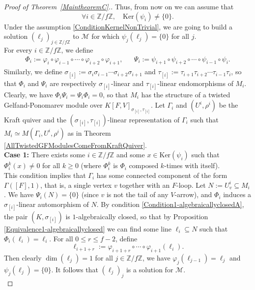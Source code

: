 \documentclass[12pt]{amsart}
\theoremstyle{definition}
\newcommand{\<}{\langle}   %
\renewcommand{\>}{\rangle} %
\begin{document}
\begin{proof}[Proof of Theorem~\ref{MaintheoremC}.]
    Thus, from now on we can assume that 
    \begin{equation}\label{ConditionKernelNonTrivial}
        \forall i \in \mathbb Z/f\mathbb Z, \quad \mathrm{Ker}(\psi_i) \not = \{0\}.
    \end{equation}
   Under the assumption \eqref{ConditionKernelNonTrivial}, we are going to build a solution $(\ell_j)_{j \in \mathbb Z/f\mathbb Z}$ to $\mathcal M$ for which $\psi_{j}(\ell_j) = \{0\}$ for all $j$.\\
    
    For every $i \in \mathbb Z/f\mathbb Z$, we define 
    \begin{align*}
        \Phi_i := \varphi_i \circ \varphi_{i-1} \circ \cdots \circ \varphi_{i+2} \circ\varphi_{i+1}, & & \Psi_i := \psi_{i+1} \circ \psi_{i+2} \circ \cdots \circ \psi_{i-1} \circ \psi_i.
    \end{align*}
    Similarly, we define $\sigma_{[i]} := \sigma_i \sigma_{i-1} \cdots \sigma_{i+2}\sigma_{i+1}$ and $\tau_{[i]} := \tau_{i+1} \tau_{i+2} \cdots \tau_{i-1}\tau_i$, so that $\Phi_i$ and $\Psi_i$ are respectively $\sigma_{[i]}$-linear and $\tau_{[i]}$-linear endomorphisms of $M_i$. Clearly, we have $\Phi_i\Psi_i = \Psi_i\Phi_i = 0$, so that $M_i$ has the structure of a twisted Gelfand-Ponomarev module over $K[F,V]_{\sigma_{[i]},\tau_{[i]}}$. Let $\Gamma_i$ and $(U^i,\rho^i)$ be the Kraft quiver and the $(\sigma_{[i]},\tau_{[i]})$-linear representation of $\Gamma_i$ such that $M_i \simeq M(\Gamma_i,U^i,\rho^i)$ as in Theorem \ref{AllTwistedGFModulesComeFromKraftQuiver}.\\

    \textbf{Case 1:} There exists some $i \in \mathbb Z/f\mathbb Z$ and some $x \in \mathrm{Ker}(\psi_i)$ such that $\Phi_i^k(x) \not = 0$ for all $k \geq 0$ (where $\Phi_i^k$ is $\Phi_i$ composed $k$-times with itself). \\
    This condition implies that $\Gamma_i$ has some connected component of the form $\Gamma([F],1)$, that is,  a single vertex $v$ together with an $F$-loop. Let $N := U^i_v \subseteq M_i$. We have $\Psi_i(N) = \{0\}$ (since $v$ is not the tail of any $V$-arrow), and $\Phi_i$ induces a $\sigma_{[i]}$-linear automorphism of $N$. By condition \ref{Condition1-algebraicallyclosedA}, the pair $(K,\sigma_{[i]})$ is $1$-algebraically closed, so that by Proposition \ref{Equivalence1-algebraicallyclosed} we can find some line $\ell_i \subseteq N$ such that $\Phi_i(\ell_i) = \ell_i$. For all $0 \leq r \leq f-2$, define 
    \begin{equation*}
        \ell_{i+1+r} := \varphi_{i+1+r} \circ \cdots \circ \varphi_{i+1}(\ell_i).
    \end{equation*}
    Then clearly $\dim(\ell_j) = 1$ for all $j \in \mathbb Z/f\mathbb Z$, we have $\varphi_{j}(\ell_{j-1}) = \ell_{j}$ and $\psi_j(\ell_j) =\{0\}$. It follows that $(\ell_j)_j$ is a solution for $\mathcal M$.\\


\end{proof}
\end{document}
